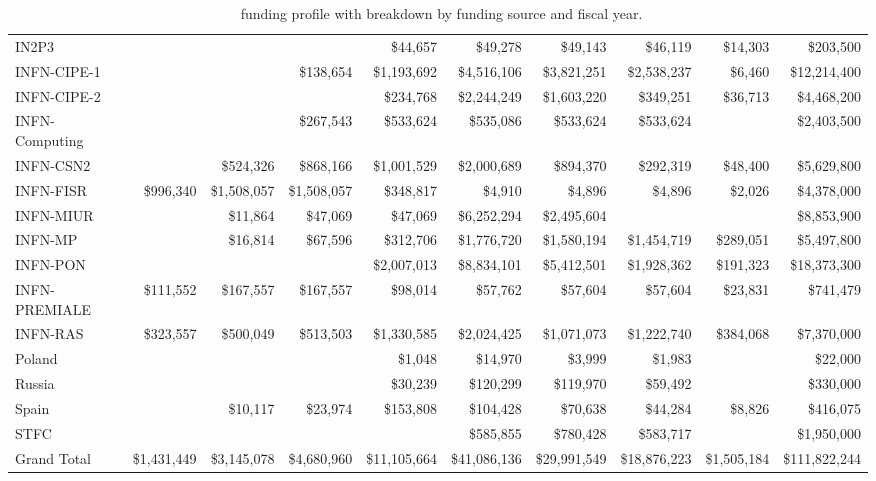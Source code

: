 \begin{table}[t]
\begin{center}
{\begin{tabular}{l|r|r|r|r|r|r|r|r|r}
IN2P3			&			&			&			&\$44,657	&\$49,278	&\$49,143	&\$46,119	&\$14,303	&\$203,500\\
INFN-CIPE-1		&			&			&\$138,654	&\$1,193,692&\$4,516,106&\$3,821,251&\$2,538,237&\$6,460	&\$12,214,400\\
INFN-CIPE-2		&			&			&			&\$234,768	&\$2,244,249&\$1,603,220&\$349,251	&\$36,713	&\$4,468,200\\
INFN-Computing	&			&			&\$267,543	&\$533,624	&\$535,086	&\$533,624	&\$533,624	&			&\$2,403,500\\
INFN-CSN2		&			&\$524,326	&\$868,166	&\$1,001,529&\$2,000,689&\$894,370	&\$292,319	&\$48,400	&\$5,629,800\\
INFN-FISR		&\$996,340	&\$1,508,057&\$1,508,057&\$348,817	&\$4,910	&\$4,896	&\$4,896	&\$2,026	&\$4,378,000\\
INFN-MIUR		&			&\$11,864	&\$47,069	&\$47,069	&\$6,252,294&\$2,495,604&			&			&\$8,853,900\\
INFN-MP			&			&\$16,814	&\$67,596	&\$312,706	&\$1,776,720&\$1,580,194&\$1,454,719&\$289,051	&\$5,497,800\\
INFN-PON		&			&			&			&\$2,007,013&\$8,834,101&\$5,412,501&\$1,928,362&\$191,323	&\$18,373,300\\
INFN-PREMIALE	&\$111,552	&\$167,557	&\$167,557	&\$98,014	&\$57,762	&\$57,604	&\$57,604	&\$23,831	&\$741,479\\
INFN-RAS		&\$323,557	&\$500,049	&\$513,503	&\$1,330,585&\$2,024,425&\$1,071,073&\$1,222,740&\$384,068	&\$7,370,000\\
Poland			&			&			&			&\$1,048	&\$14,970	&\$3,999	&\$1,983	&			&\$22,000\\
Russia			&			&			&			&\$30,239	&\$120,299	&\$119,970	&\$59,492	&			&\$330,000\\
Spain			&			&\$10,117	&\$23,974	&\$153,808	&\$104,428	&\$70,638	&\$44,284	&\$8,826	&\$416,075\\
STFC			&			&			&			&			&\$585,855	&\$780,428	&\$583,717	&			&\$1,950,000\\
\hline
Grand Total		&\$1,431,449&\$3,145,078&\$4,680,960&\$11,105,664
																&\$41,086,136
																			&\$29,991,549
																						&\$18,876,223
																									&\$1,505,184&\$111,822,244\\
\hline
\end{tabular}}
\caption[\DSk\ funding profile]{\DSk\ funding profile with breakdown by funding source and fiscal year.}
\end{center}
\end{table}

